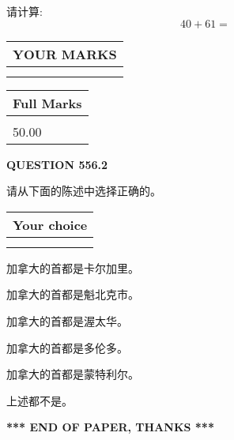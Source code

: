 \documentclass{ctexart}
\begin{document}
  
 
请计算:
\begin{equation}
40 +  %
61 = \nonumber
\end{equation}
 

 

 
  
\vspace{0.2in}
  
\noindent\begin{tabular}{|l|}
\hline
 YOUR MARKS  \\
\hline
 \\ 
 \\ 
\hline
\end{tabular}
\hspace{0.05in} \begin{tabular}{|l|}
\hline
 Full Marks  \\
\hline
 \\ 
50.00 \\
\hline
\end{tabular}
{\textbf{\Large{QUESTION
556.2 
}}}
  
  
请从下面的陈述中选择正确的。
  
  
\noindent\hspace{3.0in} \begin{tabular}{|l|}
\hline
Your choice \\
\hline
 \\ 
 \\ 
\hline
\end{tabular}
  
  
 
 
加拿大的首都是卡尔加里。
 
 
加拿大的首都是魁北克市。
 
 
加拿大的首都是渥太华。
 
 
加拿大的首都是多伦多。
 
 
加拿大的首都是蒙特利尔。
 
 
 上述都不是。
 
 
   
   
 \vspace{0.2in}
 
   
   
   
   
\vspace{1.0in} 
{\textbf{\large{ *** END OF PAPER, THANKS *** }}} 
   
\end{document}
